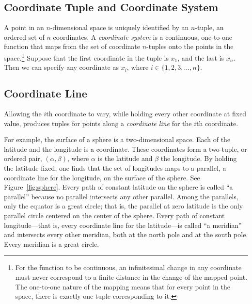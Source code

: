 \documentclass[twocolumn,10pt]{book}
\begin{document}
\subsection{Coordinate Tuple and Coordinate System}

A point in an $n$-dimensional space is uniquely identified by an $n$-tuple, an
ordered set of $n$ coordinates.  A \emph{coordinate system} is a continuous,
one-to-one function that maps from the set of coordinate $n$-tuples onto the
points in the space.\footnote{%
   For the function to be continuous, an infinitesimal change in any coordinate
   must never correspond to a finite distance in the change of the mapped
   point.  The one-to-one nature of the mapping means that for every point in
   the space, there is exactly one tuple corresponding to it.%
}
Suppose that the first coordinate in the tuple is $x_1$, and the last is $x_n$.
Then we can specify any coordinate as $x_i$, where $i \in \{1, 2, 3, \ldots,
n\}$.

\subsection{Coordinate Line}

Allowing the $i$th coordinate to vary, while holding every other coordinate at
fixed value, produces tuples for points along a \emph{coordinate line} for the
$i$th coordinate.

For example, the surface of a sphere is a two-dimensional space.  Each of the
latitude and the longitude is a coordinate.  These coordinates form a
two-tuple, or ordered pair, $(\alpha,\beta)$, where $\alpha$ is the latitude
and $\beta$ the longitude.  By holding the latitude fixed, one finds that the
set of longitudes maps to a parallel, a coordinate line for the longitude, on
the surface of the sphere.  See Figure~\ref{fig:sphere}.  Every path of
constant latitude on the sphere is called ``a parallel'' because no parallel
intersects any other parallel.  Among the parallels, only the equator is a
great circle; that is, the parallel at zero latitude is the only parallel
circle centered on the center of the sphere.  Every path of constant
longitude---that is, every coordinate line for the latitude---is called ``a
meridian'' and intersects every other meridian, both at the north pole and at
the south pole.  Every meridian is a great circle.
\end{document}
